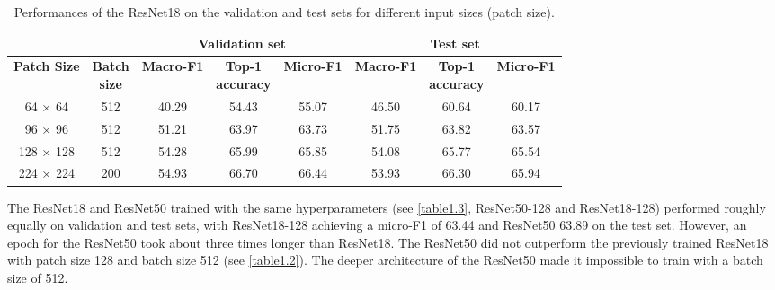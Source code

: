 \begin{table}[htbp]
  \centering
  \normalsize
  \caption{Performances of the ResNet18 on the validation and test sets for different input sizes (patch size).}
  \label{table1.2}
    \begin{tabular}{*{2}{c}|*{3}{c}|*{3}{c}}
        \toprule
        \multicolumn{2}{c}{\textbf{}}             & \multicolumn{3}{c}{\textbf{Validation set}}                     & \multicolumn{3}{c}{\textbf{Test set}}                           \\ 
        \midrule
        \textbf{Patch Size} & \makecell{\textbf{Batch} \\ \textbf{size}} & \textbf{Macro-F1} & \makecell{\textbf{Top-1} \\ \textbf{accuracy}} & \textbf{Micro-F1} & \textbf{Macro-F1} & \makecell{\textbf{Top-1} \\ \textbf{accuracy}} & \textbf{Micro-F1} \\ \midrule
        64 × 64             & 512                 & 40.29             & 54.43                   & 55.07             & 46.50             & 60.64                   & 60.17             \\
        96 × 96             & 512                 & 51.21             & 63.97                   & 63.73             & 51.75             & 63.82                   & 63.57             \\
        128 × 128           & 512                 & 54.28             & 65.99                   & 65.85             & 54.08             & 65.77                   & 65.54             \\
        224 × 224           & 200                 & 54.93             & 66.70                   & 66.44             & 53.93             & 66.30                   & 65.94             \\ \bottomrule
    \end{tabular}
\end{table}

The ResNet18 and ResNet50 trained with the same hyperparameters  (see \autoref{table1.3}, ResNet50-128 and ResNet18-128) performed roughly equally on validation and test sets, with ResNet18-128 achieving a micro-F1 of 63.44 and ResNet50 63.89 on the test set. However, an epoch for the ResNet50 took about three times longer than ResNet18. The ResNet50 did not outperform the previously trained ResNet18 with patch size 128 and batch size 512 (see \autoref{table1.2}). The deeper architecture of the ResNet50 made it impossible to train with a batch size of 512.


